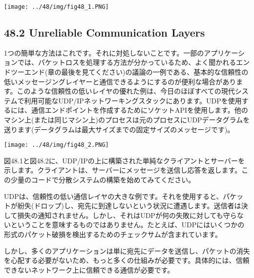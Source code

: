 \texttt{[image: ../48/img/fig48\_1.PNG]}

\hypertarget{unreliable-communication-layers}{%
\subsection*{48.2 Unreliable Communication
Layers}\label{unreliable-communication-layers}}

1つの簡単な方法はこれです。それに対処しないことです。一部のアプリケーションでは、パケットロスを処理する方法が分かっているため、よく聞かれるエンドツーエンド(章の最後を見てください)の議論の一例である、基本的な信頼性の低いメッセージングレイヤーと通信できるようにするのが便利な場合があります。このような信頼性の低いレイヤの優れた例は、今日のほぼすべての現代システムで利用可能なUDP/IPネットワーキングスタックにあります。UDPを使用するには、通信エンドポイントを作成するためにソケットAPIを使用します。他のマシン上(または同じマシン上)のプロセスは元のプロセスにUDPデータグラムを送ります(データグラムは最大サイズまでの固定サイズのメッセージです)。

\texttt{[image: ../48/img/fig48\_2.PNG]}

図48.1と図48.2に、UDP/IPの上に構築された単純なクライアントとサーバーを示します。クライアントは、サーバーにメッセージを送信し応答を返します。この少量のコードで分散システムの構築を始めてみてください。

UDPは、信頼性の低い通信レイヤの大きな例です。それを使用すると、パケットが紛失(ドロップ)し、宛先に到達しないという状況に遭遇します。送信者は決して損失の通知されません。しかし、それはUDPが何の失敗に対しても守らないということを意味するものではありません。たとえば、UDPにはいくつかの形式のパケット破損を検出するためのチェックサムが含まれています。

しかし、多くのアプリケーションは単に宛先にデータを送信し、パケットの消失を心配する必要がないため、もっと多くの仕組みが必要です。具体的には、信頼できないネットワーク上に信頼できる通信が必要です。

